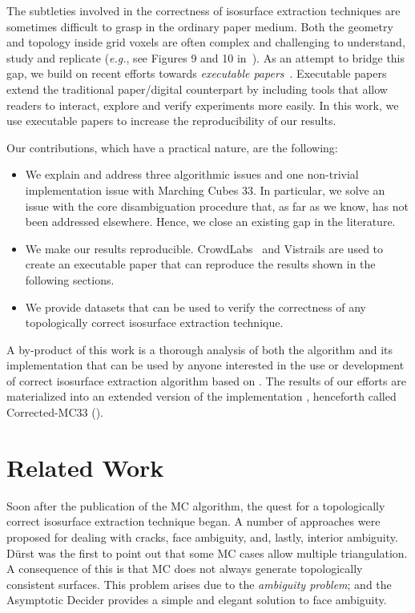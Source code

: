  The subtleties involved in the correctness of isosurface extraction techniques are sometimes difficult to grasp in the ordinary paper medium. Both the geometry and topology inside grid voxels are often complex and challenging to understand,  study and replicate ({\em e.g.}, see Figures 9 and 10 in~\cite{10.1109/TVCG.2003.1207437}).  As an attempt to bridge this gap, we build on recent efforts towards \emph{executable papers}~\cite{Koop:2011tv, Tohline:2010jn}. Executable papers extend the traditional paper/digital counterpart by including tools that allow readers to interact, explore and verify experiments more easily.  In this work, we use executable papers to increase the reproducibility of our results.
 
Our contributions, which have a practical nature, are the following:
\begin{itemize}
\item We explain and address three algorithmic issues and one non-trivial implementation issue with Marching Cubes 33. In particular, we solve an issue with the core \mc{} disambiguation procedure that, as far as we know, has not been addressed elsewhere. Hence, we close an existing gap in the \mc{} literature.
\item We make our results reproducible. CrowdLabs~\cite{Tohline:2010jn} and Vistrails \cite{Freire:2006va} are used to create an executable paper that can reproduce the results shown in the following sections.
\item We provide datasets that  can be used to verify the correctness of any topologically correct isosurface extraction technique.
\end{itemize}
A by-product of this work is a thorough analysis of both the \mc{} algorithm and its implementation that can be used by anyone interested in  the use or development of correct isosurface extraction algorithm based on \mc{}. The results of our efforts are materialized into an extended version of the \mc{} implementation \cite{lewiner:impl}, henceforth called Corrected-MC33 (\cmc).




\section{Related Work}
\label{related_work1}

Soon after the publication of the MC algorithm, the quest for a topologically correct isosurface extraction technique began. A number of approaches were proposed for dealing with cracks, face ambiguity, and, lastly, interior ambiguity.
%
D\"urst \cite{Durst88} was the first to point out that some MC cases allow multiple triangulation. A consequence of this is that MC does not always generate topologically consistent surfaces. This problem arises due to the \emph{ambiguity problem}; and
the Asymptotic Decider \cite{Nielson:1991:ADR:949607.949621} provides a simple and elegant solution to face ambiguity.

